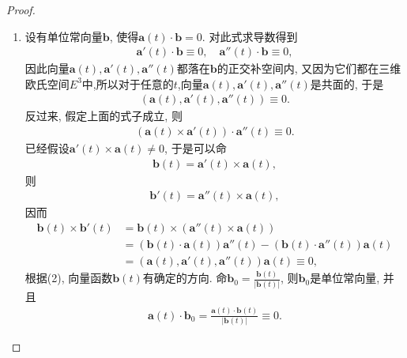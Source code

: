 \documentclass[../../main.tex]{subfiles}%
\begin{document}
\begin{proof}
\begin{enumerate}[(1)]
\item 设有单位常向量$\bm{b}$, 使得$\bm{a}(t)\cdot\bm{b}=0$. 对此式求导数得到
\begin{align*}
\bm{a}'(t)\cdot\bm{b}\equiv 0,\quad \bm{a}''(t)\cdot\bm{b}\equiv 0,
\end{align*}
因此向量$\bm{a}(t),\bm{a}'(t),\bm{a}''(t)$都落在$\bm{b}$的正交补空间内, 又因为它们都在三维欧氏空间$E^3$中,所以对于任意的$t$,向量$\bm{a}(t),\bm{a}'(t),\bm{a}''(t)$是共面的, 于是
\begin{align*}
(\bm{a}(t),\bm{a}'(t),\bm{a}''(t))\equiv 0.
\end{align*}
反过来, 假定上面的式子成立, 则
\begin{align*}
(\bm{a}(t)\times\bm{a}'(t))\cdot\bm{a}''(t)\equiv 0.
\end{align*}
已经假设$\bm{a}'(t)\times\bm{a}(t)\neq 0$, 于是可以命
\begin{align*}
\bm{b}(t) = \bm{a}'(t)\times\bm{a}(t),
\end{align*}
则
\begin{align*}
\bm{b}'(t) = \bm{a}''(t)\times\bm{a}(t),
\end{align*}
因而
\begin{align*}
\bm{b}(t)\times\bm{b}'(t) &= \bm{b}(t)\times(\bm{a}''(t)\times\bm{a}(t)) \\
&= (\bm{b}(t)\cdot\bm{a}(t))\bm{a}''(t) - (\bm{b}(t)\cdot\bm{a}''(t))\bm{a}(t) \\
&= (\bm{a}(t),\bm{a}'(t),\bm{a}''(t))\bm{a}(t)\equiv 0,
\end{align*}
根据(2), 向量函数$\bm{b}(t)$有确定的方向. 命$\bm{b}_0 = \frac{\boldsymbol{b}\left( t \right)}{\left| \boldsymbol{b}\left( t \right) \right|}$, 则$\bm{b}_0$是单位常向量, 并且
\begin{align*}
\bm{a}(t)\cdot\bm{b}_0 = \frac{\bm{a}(t)\cdot\bm{b}(t)}{|\bm{b}(t)|}\equiv 0.
\end{align*}
\end{enumerate}
\end{proof}
\end{document}
